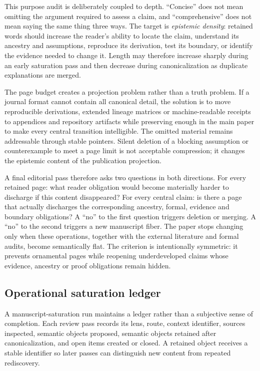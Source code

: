This purpose audit is deliberately coupled to depth. ``Concise'' does not mean omitting the argument required to assess a claim, and ``comprehensive'' does not mean saying the same thing three ways. The target is \emph{epistemic density}: retained words should increase the reader's ability to locate the claim, understand its ancestry and assumptions, reproduce its derivation, test its boundary, or identify the evidence needed to change it. Length may therefore increase sharply during an early saturation pass and then decrease during canonicalization as duplicate explanations are merged.

The page budget creates a projection problem rather than a truth problem. If a journal format cannot contain all canonical detail, the solution is to move reproducible derivations, extended lineage matrices or machine-readable receipts to appendices and repository artifacts while preserving enough in the main paper to make every central transition intelligible. The omitted material remains addressable through stable pointers. Silent deletion of a blocking assumption or counterexample to meet a page limit is not acceptable compression; it changes the epistemic content of the publication projection.

A final editorial pass therefore asks two questions in both directions. For every retained page: what reader obligation would become materially harder to discharge if this content disappeared? For every central claim: is there a page that actually discharges the corresponding ancestry, formal, evidence and boundary obligations? A ``no'' to the first question triggers deletion or merging. A ``no'' to the second triggers a new manuscript fiber. The paper stops changing only when these operations, together with the external literature and formal audits, become semantically flat. The criterion is intentionally symmetric: it prevents ornamental pages while reopening underdeveloped claims whose evidence, ancestry or proof obligations remain hidden.

\subsection{Operational saturation ledger}

A manuscript-saturation run maintains a ledger rather than a subjective sense of completion. Each review pass records its lens, route, context identifier, sources inspected, semantic objects proposed, semantic objects retained after canonicalization, and open items created or closed. A retained object receives a stable identifier so later passes can distinguish new content from repeated rediscovery.


